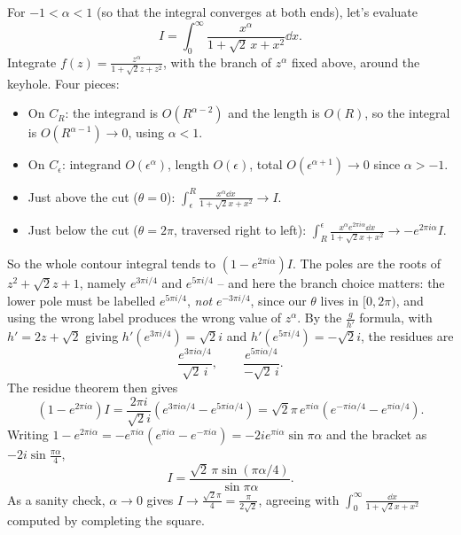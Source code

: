 \documentclass[a4paper]{scrartcl}
\begin{document}
\begin{example}
	For $-1 < \alpha < 1$ (so that the integral converges at both ends), let's evaluate
	$$
	I = \int_0^\infty \frac{x^\alpha}{1 + \sqrt 2\, x + x^2} \dd x.
	$$
	Integrate $f(z) = \frac{z^\alpha}{1 + \sqrt 2 z + z^2}$, with the branch of $z^\alpha$ fixed above, around the keyhole. Four pieces:
	\begin{itemize}
		\item On $C_R$: the integrand is $O(R^{\alpha - 2})$ and the length is $O(R)$, so the integral is $O(R^{\alpha - 1}) \to 0$, using $\alpha < 1$.
		\item On $C_\epsilon$: integrand $O(\epsilon^\alpha)$, length $O(\epsilon)$, total $O(\epsilon^{\alpha + 1}) \to 0$ since $\alpha > -1$.
		\item Just above the cut ($\theta = 0$): $\displaystyle \int_\epsilon^R \frac{x^\alpha \dd x}{1 + \sqrt 2 x + x^2} \to I$.
		\item Just below the cut ($\theta = 2\pi$, traversed right to left): $\displaystyle \int_R^\epsilon \frac{x^\alpha e^{2\pi i \alpha} \dd x}{1 + \sqrt 2 x + x^2} \to -e^{2\pi i \alpha} I$.
	\end{itemize}
	So the whole contour integral tends to $(1 - e^{2\pi i \alpha}) I$. The poles are the roots of $z^2 + \sqrt 2 z + 1$, namely $e^{3\pi i/4}$ and $e^{5\pi i /4}$ -- and here the branch choice matters: the lower pole must be labelled $e^{5\pi i/4}$, \emph{not} $e^{-3\pi i /4}$, since our $\theta$ lives in $[0, 2\pi)$, and using the wrong label produces the wrong value of $z^\alpha$. By the $\frac{g}{h'}$ formula, with $h' = 2z + \sqrt 2$ giving $h'(e^{3\pi i/4}) = \sqrt 2 i$ and $h'(e^{5\pi i /4}) = -\sqrt 2 i$, the residues are
	$$
	\frac{e^{3\pi i \alpha/4}}{\sqrt 2\, i}, \qquad \frac{e^{5\pi i \alpha /4}}{-\sqrt 2\, i}.
	$$
	The residue theorem then gives
	$$
	(1 - e^{2\pi i \alpha}) I = \frac{2\pi i}{\sqrt 2 i}\left(e^{3\pi i\alpha/4} - e^{5\pi i \alpha/4}\right) = \sqrt 2 \pi \, e^{\pi i \alpha}\left(e^{-\pi i \alpha/4} - e^{\pi i \alpha/4}\right).
	$$
	Writing $1 - e^{2\pi i \alpha} = -e^{\pi i \alpha}(e^{\pi i \alpha} - e^{-\pi i \alpha}) = -2ie^{\pi i \alpha}\sin \pi\alpha$ and the bracket as $-2i \sin\frac{\pi\alpha}{4}$,
	$$
	I = \frac{\sqrt 2 \, \pi \sin(\pi\alpha/4)}{\sin \pi \alpha}.
	$$
	As a sanity check, $\alpha \to 0$ gives $I \to \frac{\sqrt 2 \pi}{4} = \frac{\pi}{2\sqrt 2}$, agreeing with $\int_0^\infty \frac{\dd x}{1 + \sqrt 2 x + x^2}$ computed by completing the square.
\end{example}
\end{document}
